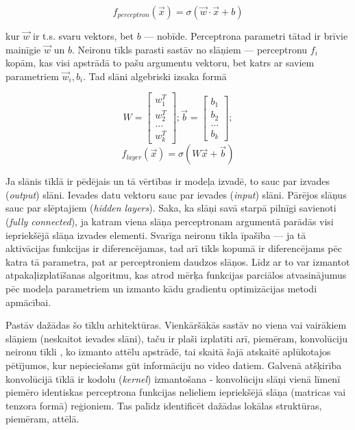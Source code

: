 \documentclass[12pt, a4paper]{article}
\numberwithin{equation}{section} %
\begin{document}
\begin{equation} 
    f_{perceptron}(\vec{x}) = \sigma(\vec{w} \cdot \vec{x}+b)
\end{equation}

kur $\vec{w}$ ir t.s. svaru vektors, bet $b$ ---  nobīde. Perceptrona parametri tātad ir brīvie mainīgie $\vec{w}$ un $b$. Neironu tīkls parasti sastāv no slāņiem --- perceptronu $f_i$ kopām, kas visi apstrādā to pašu argumentu vektoru, bet katrs ar saviem parametriem $\vec{w}_i,b_i$. Tad slāni algebriski izsaka formā

\begin{equation} 
    W = \begin{bmatrix}
        w_1^T \\
        w_2^T \\
        ... \\
        w_k^T
    \end{bmatrix}; 
    \vec{b} =  \begin{bmatrix}
        b_1 \\
        b_2 \\
        ... \\
        b_k
    \end{bmatrix}; 
\end{equation}
\begin{equation} 
    f_{layer}(\vec{x}) = \sigma(W\vec{x}+\vec{b})
\end{equation}

Ja slānis tīklā ir pēdējais un tā vērtības ir modeļa izvadē, to sauc par izvades (\textit{output}) slāni. Ievades datu vektoru sauc par ievades (\textit{input}) slāni. Pārējos slāņus sauc par slēptajiem (\textit{hidden layers}). Saka, ka slāņi savā starpā pilnīgi savienoti (\textit{fully connected}), ja katram viena slāņa perceptronam argumentā parādās visi iepriekšējā slāņa izvades elementi. Svarīga neironu tīkla īpašība --- ja tā aktivācijas funkcijas ir diferencējamas, tad arī tīkls kopumā ir diferencējams pēc katra tā parametra, pat ar perceptroniem daudzos slāņos. Līdz ar to var izmantot atpakaļizplatīšanas algoritmu, kas atrod mērķa funkcijas parciālos atvasinājumus pēc modeļa parametriem un izmanto kādu gradientu optimizācijas metodi apmācībai.

Pastāv dažādas šo tīklu arhitektūras. Vienkāršākās sastāv no viena vai vairākiem slāņiem (neskaitot ievades slāni), taču ir plaši izplatīti arī, piemēram, konvolūciju neironu tīkli \cite{krizhevsky2012imagenet}, ko izmanto attēlu apstrādē, tai skaitā šajā atskaitē aplūkotajos pētījumos, kur nepieciešams gūt informāciju no video datiem. Galvenā atšķirība konvolūcijā tīklā ir kodolu (\textit{kernel}) izmantošana - konvolūciju slāņi vienā līmenī piemēro identiskas perceptrona funkcijas nelieliem iepriekšējā slāņa (matricas vai tenzora formā) reģioniem. Tas palīdz identificēt dažādas lokālas struktūras, piemēram, attēlā. 
\end{document}
